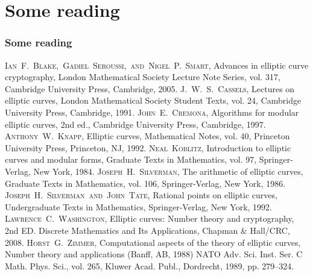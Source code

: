 \documentclass[10pt,final]{beamer} %
\theoremstyle{definition}
\begin{document}
\section{Some reading}
\begin{frame}
\frametitle{Some reading}
\begin{scriptsize}
\begin{thebibliography}{99}
 \textsc{Ian~F.~Blake,~Gadiel~Seroussi,~and~Nigel~P.~Smart},
Advances in elliptic curve cryptography, London Mathematical Society Lecture Note Series, vol. 317, Cambridge University Press, Cambridge, 2005.
  \textsc{J.~W.~S.~Cassels},
Lectures on elliptic curves, London Mathematical Society Student Texts, vol. 24, Cambridge University Press, Cambridge, 1991.
  \textsc{John~E.~Cremona},
Algorithms for modular elliptic curves, 2nd ed., Cambridge University Press, Cambridge, 1997.
  \textsc{Anthony~W.~Knapp},
Elliptic curves, Mathematical Notes, vol. 40, Princeton University Press, Princeton, NJ, 1992.
  \textsc{Neal~Koblitz},
Introduction to elliptic curves and modular forms, Graduate Texts in Mathematics, vol. 97, Springer-Verlag, New York, 1984.
  \textsc{Joseph~H.~Silverman},
The arithmetic of elliptic curves, Graduate Texts in Mathematics, vol. 106, Springer-Verlag, New York, 1986.
 \textsc{Joseph~H.~Silverman~and~John~Tate},
Rational points on elliptic curves, Undergraduate Texts in Mathematics, Springer-Verlag, New York, 1992.
 \textsc{Lawrence~C.~Washington},
Elliptic curves: Number theory and cryptography, 2nd ED. Discrete Mathematics and Its Applications, Chapman \& Hall/CRC, 2008.
 \textsc{Horst~G.~Zimmer},
Computational aspects of the theory of elliptic curves, Number theory and applications
(Banff, AB, 1988) NATO Adv. Sci. Inst. Ser. C Math. Phys. Sci., vol. 265, Kluwer Acad. Publ., Dordrecht, 1989, pp. 279--324.
\end{thebibliography}
\end{scriptsize}
\end{frame}
\end{document}
